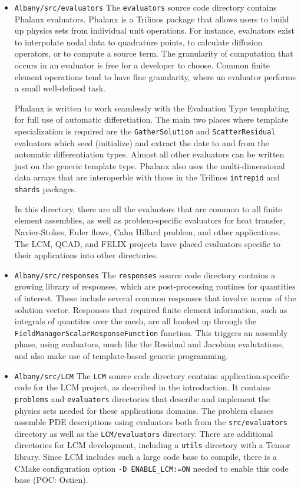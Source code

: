 \documentclass[pdf,12pt,report,strict]{SANDreport}
\theoremstyle{remark}
\begin{document}
\begin{itemize}
\item{\texttt{Albany/src/evaluators}}  The \texttt{evaluators} source code directory contains
Phalanx evaluators. Phalanx is a Trilinos package that allows users to build up physics
sets from individual unit operations. For instance, evaluators exist to interpolate
nodal data to quadrature points, to calculate diffusion operators, or to compute a
source term. The granularity of computation that occurs in an evaluator is 
free for a developer to choose. Common finite element operations tend to have fine
granularity, where an evaluator performs a small well-defined task.

Phalanx is written to work seamlessly with the Evaluation Type templating for full
use of automatic differetiation. The main two places where template specialization is
required are the \texttt{GatherSolution} and \texttt{ScatterResidual} evaluators which
seed (initialize) and extract the date to and from the automatic differentiation types.
Almost all other evaluators can be written just on the generic template type.
Phalanx also uses the multi-dimensional data arrays that are interoperble with those in the
Trilinos \texttt{intrepid} and \texttt{shards} packages.

In this directory, there are all the evaluotors that are common to all finite element
assemblies, as well as problem-specific evaluators for heat transfer, Navier-Stokes, 
Euler flows, Cahn Hillard problem, and other applications. The LCM, QCAD, and
FELIX projects have placed evaluators specific to their applications into 
other directories.

\item{\texttt{Albany/src/responses}}  The \texttt{responses} source code directory contains
a growing library of responses, which are post-processing routines for quantities of interest.
These include several common responses that involve norms of the solution vector. 
Responses that required finite element information, such as integrals of quantites
over the mesh, are all hooked up through the
\texttt{FieldManagerScalarResponseFunction} function. This triggers an assembly
phase, using evaluators, much like the Residual and Jacobian evalutations, and 
also make use of template-based generic programming.

\item{\texttt{Albany/src/LCM}}  The \texttt{LCM} source code directory contains 
application-specific code for the LCM project, as described in the introduction. It contains
\texttt{problems} and \texttt{evaluators} directories that describe and implement
the physics sets needed for these applications domains. The problem classes assemble
PDE descriptions using evaluators both from the \texttt{src/evaluators} directory as
well as the \texttt{LCM/evaluators} directory. There are additional
directories for LCM development, including a \texttt{utils} directory with a Tensor
library. Since LCM includes such a large code base to compile, there is a CMake configuration 
option \texttt{-D ENABLE\_LCM:=ON} needed to enable this code base (POC: Ostien).


\end{itemize}
\end{document}
